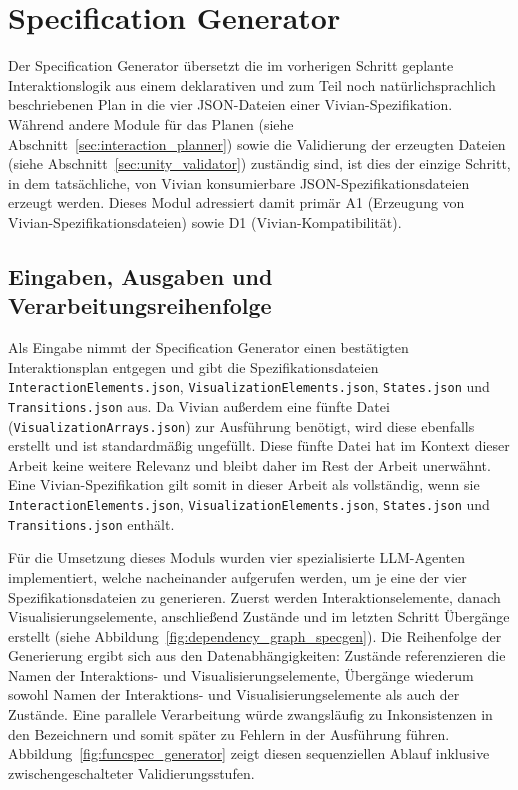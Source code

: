 \section{Specification Generator}\label{sec:funcspec_generator}

Der Specification Generator übersetzt die im vorherigen Schritt geplante Interaktionslogik aus einem deklarativen und zum Teil noch natürlichsprachlich beschriebenen Plan in die vier JSON-Dateien einer Vivian-Spezifikation. Während andere Module für das Planen (siehe Abschnitt~\ref{sec:interaction_planner}) sowie die Validierung der erzeugten Dateien (siehe Abschnitt~\ref{sec:unity_validator}) zuständig sind, ist dies der einzige Schritt, in dem tatsächliche, von Vivian konsumierbare JSON-Spezifikationsdateien erzeugt werden.
Dieses Modul adressiert damit primär A1 (Erzeugung von Vivian-Spezifikationsdateien) sowie D1 (Vivian-Kompatibilität).

\subsection*{Eingaben, Ausgaben und Verarbeitungsreihenfolge}
Als Eingabe nimmt der Specification Generator einen bestätigten Interaktionsplan entgegen und gibt die Spezifikationsdateien \texttt{InteractionElements.json}, \texttt{VisualizationElements.json}, \texttt{States.json} und \texttt{Transitions.json} aus. Da Vivian außerdem eine fünfte Datei (\texttt{VisualizationArrays.json}) zur Ausführung benötigt, wird diese ebenfalls erstellt und ist standardmäßig ungefüllt. Diese fünfte Datei hat im Kontext dieser Arbeit keine weitere Relevanz und bleibt daher im Rest der Arbeit unerwähnt. Eine Vivian-Spezifikation gilt somit in dieser Arbeit als vollständig, wenn sie \texttt{InteractionElements.json}, \texttt{VisualizationElements.json}, \texttt{States.json} und \texttt{Transitions.json} enthält.

Für die Umsetzung dieses Moduls wurden vier spezialisierte LLM-Agenten implementiert, welche nacheinander aufgerufen werden, um je eine der vier Spezifikationsdateien zu generieren.
Zuerst werden Interaktionselemente, danach Visualisierungselemente, anschließend Zustände und im letzten Schritt Übergänge erstellt (siehe Abbildung~\ref{fig:dependency_graph_specgen}).
Die Reihenfolge der Generierung ergibt sich aus den Datenabhängigkeiten: Zustände referenzieren die Namen der Interaktions- und Visualisierungselemente, Übergänge wiederum sowohl Namen der Interaktions- und Visualisierungselemente als auch der Zustände.
Eine parallele Verarbeitung würde zwangsläufig zu Inkonsistenzen in den Bezeichnern und somit später zu Fehlern in der Ausführung führen.
Abbildung~\ref{fig:funcspec_generator} zeigt diesen sequenziellen Ablauf inklusive zwischengeschalteter Validierungsstufen.

